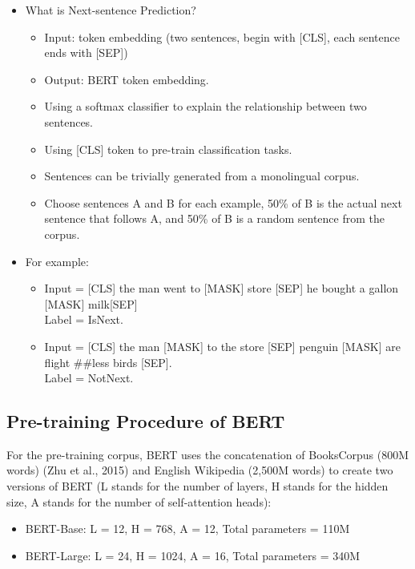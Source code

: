 \documentclass[]{krantz}
\providecommand{\tightlist}{%
  \setlength{\itemsep}{0pt}\setlength{\parskip}{0pt}}
\begin{document}
\begin{itemize}
\tightlist
\item
  What is Next-sentence Prediction?

  \begin{itemize}
  \tightlist
  \item
    Input: token embedding (two sentences, begin with {[}CLS{]}, each sentence ends with {[}SEP{]})
  \item
    Output: BERT token embedding.
  \item
    Using a softmax classifier to explain the relationship between two sentences.
  \item
    Using {[}CLS{]} token to pre-train classification tasks.
  \item
    Sentences can be trivially generated from a monolingual corpus.
  \item
    Choose sentences A and B for each example, 50\% of B is the actual next sentence that follows A, and 50\% of B is a random sentence from the corpus.
  \end{itemize}
\item
  For example:

  \begin{itemize}
  \tightlist
  \item
    Input = {[}CLS{]} the man went to {[}MASK{]} store {[}SEP{]} he bought a gallon {[}MASK{]} milk{[}SEP{]}\\
    Label = IsNext.
  \item
    Input = {[}CLS{]} the man {[}MASK{]} to the store {[}SEP{]} penguin {[}MASK{]} are flight \#\#less birds {[}SEP{]}.\\
    Label = NotNext.
  \end{itemize}
\end{itemize}

\hypertarget{pre-training-procedure-of-bert}{%
\subsection{Pre-training Procedure of BERT}\label{pre-training-procedure-of-bert}}

For the pre-training corpus, BERT uses the concatenation of BooksCorpus (800M words) (Zhu et al., 2015) and English Wikipedia (2,500M words) to create two versions of BERT (L stands for the number of layers, H stands for the hidden size, A stands for the number of self-attention heads):

\begin{itemize}
\tightlist
\item
  BERT-Base: L = 12, H = 768, A = 12, Total parameters = 110M
\item
  BERT-Large: L = 24, H = 1024, A = 16, Total parameters = 340M
\end{itemize}
\end{document}
